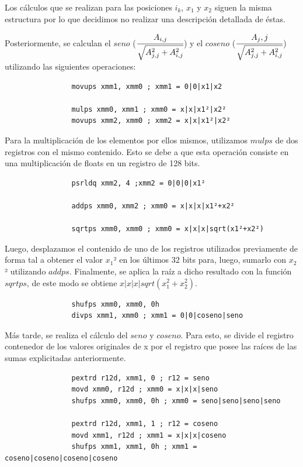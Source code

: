 \documentclass[10pt, a4paper]{article}
\begin{document}
Los cálculos que se realizan para las posiciones $i_k$, $x_1$ y $x_2$ siguen la misma estructura por lo que decidimos no realizar una descripción detallada de éstas.

Posteriormente, se calculan el $seno$ ($\cfrac{A_{i,j}}{\sqrt{A_{j,j}^2 + A_{i,j}^2}}$) y el $coseno$ ($\cfrac{A_j,j}{\sqrt{A_{j,j}^2 + A_{i,j}^2}}$) utilizando las siguientes operaciones:


\begin{verbatim}
                movups xmm1, xmm0 ; xmm1 = 0|0|x1|x2

                mulps xmm0, xmm1 ; xmm0 = x|x|x1²|x2²
                movups xmm2, xmm0 ; xmm2 = x|x|x1²|x2²
\end{verbatim}
Para la multiplicación de los elementos por ellos mismos, utilizamos $mulps$ de dos registros con el mismo contenido. Esto se debe a que esta operación consiste en una multiplicación de floats en un registro de 128 bits.
\begin{verbatim}
                psrldq xmm2, 4 ;xmm2 = 0|0|0|x1²

                addps xmm0, xmm2 ; xmm0 = x|x|x|x1²+x2²

                sqrtps xmm0, xmm0 ; xmm0 = x|x|x|sqrt(x1²+x2²)
\end{verbatim}
Luego, desplazamos el contenido de uno de los registros utilizados previamente de forma tal a obtener el valor $x_1$² en los últimos 32 bits para, luego, sumarlo con $x_2$
² utilizando $addps$. Finalmente, se aplica la raíz a dicho resultado con la función $sqrtps$, de este modo se obtiene $x|x|x|sqrt(x_1^2+x_2^2)$.

\begin{verbatim}
                shufps xmm0, xmm0, 0h
                divps xmm1, xmm0 ; xmm1 = 0|0|coseno|seno
\end{verbatim}
Más tarde, se realiza el cálculo del $seno$ y $coseno$. Para esto, se divide el registro contenedor de los valores originales de x por el registro que posee las raíces de las sumas explicitadas anteriormente.
\begin{verbatim}
                pextrd r12d, xmm1, 0 ; r12 = seno
                movd xmm0, r12d ; xmm0 = x|x|x|seno
                shufps xmm0, xmm0, 0h ; xmm0 = seno|seno|seno|seno

                pextrd r12d, xmm1, 1 ; r12 = coseno
                movd xmm1, r12d ; xmm1 = x|x|x|coseno
                shufps xmm1, xmm1, 0h ; xmm1 = coseno|coseno|coseno|coseno
\end{verbatim}
\end{document}
